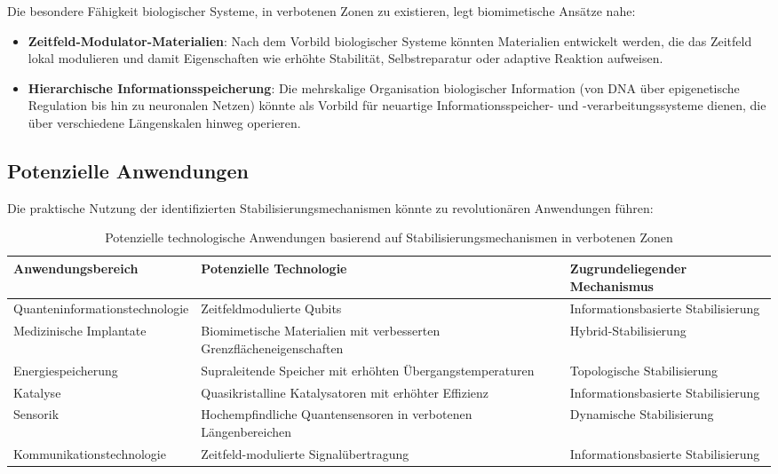 \documentclass[12pt,a4paper]{article}
\begin{document}
	Die besondere Fähigkeit biologischer Systeme, in verbotenen Zonen zu existieren, legt biomimetische Ansätze nahe:
	
	\begin{itemize}
		\item \textbf{Zeitfeld-Modulator-Materialien}: Nach dem Vorbild biologischer Systeme könnten Materialien entwickelt werden, die das Zeitfeld lokal modulieren und damit Eigenschaften wie erhöhte Stabilität, Selbstreparatur oder adaptive Reaktion aufweisen.
		
		\item \textbf{Hierarchische Informationsspeicherung}: Die mehrskalige Organisation biologischer Information (von DNA über epigenetische Regulation bis hin zu neuronalen Netzen) könnte als Vorbild für neuartige Informationsspeicher- und -verarbeitungssysteme dienen, die über verschiedene Längenskalen hinweg operieren.
	\end{itemize}
	
	\subsection{Potenzielle Anwendungen}
	
	Die praktische Nutzung der identifizierten Stabilisierungsmechanismen könnte zu revolutionären Anwendungen führen:
	
	\begin{table}[h]
		\centering
		\begin{adjustbox}{scale=0.65}
			\begin{tabular}{lll}
				\hline
				\textbf{Anwendungsbereich} & \textbf{Potenzielle Technologie} & \textbf{Zugrundeliegender Mechanismus} \\
				\hline
				Quanteninformationstechnologie & Zeitfeldmodulierte Qubits & Informationsbasierte Stabilisierung \\
				Medizinische Implantate & Biomimetische Materialien mit verbesserten Grenzflächeneigenschaften & Hybrid-Stabilisierung \\
				Energiespeicherung & Supraleitende Speicher mit erhöhten Übergangstemperaturen & Topologische Stabilisierung \\
				Katalyse & Quasikristalline Katalysatoren mit erhöhter Effizienz & Informationsbasierte Stabilisierung \\
				Sensorik & Hochempfindliche Quantensensoren in verbotenen Längenbereichen & Dynamische Stabilisierung \\
				Kommunikationstechnologie & Zeitfeld-modulierte Signalübertragung & Informationsbasierte Stabilisierung \\
				\hline
			\end{tabular}
		\end{adjustbox}
		\caption{Potenzielle technologische Anwendungen basierend auf Stabilisierungsmechanismen in verbotenen Zonen}
		\label{tab:applications}
	\end{table}
	
\end{document}
